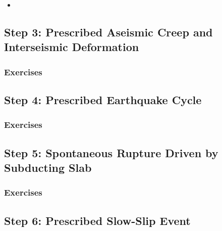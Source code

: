 
\begin{itemize}
\item
\end{itemize}
    




\subsection{Step 3: Prescribed Aseismic Creep and Interseismic Deformation}

\subsubsection{Exercises}

\subsection{Step 4: Prescribed Earthquake Cycle}

\subsubsection{Exercises}




\subsection{Step 5: Spontaneous Rupture Driven by Subducting Slab}

\subsubsection{Exercises}

\subsection{Step 6: Prescribed Slow-Slip Event}

